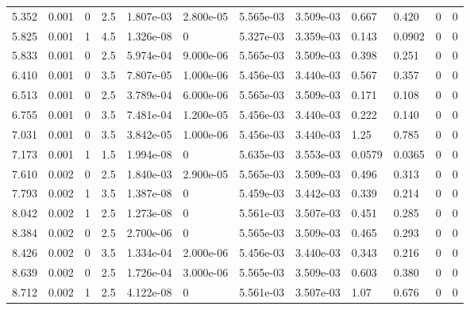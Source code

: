 \documentclass[preview]{standalone}
\begin{document}
{{\begin{tabular}{L{1.2cm}C{1.2cm} C{0.3cm}C{0.5cm} C{1.4cm}C{1.4cm} C{1.4cm}C{1.4cm} C{1.6cm}C{1.6cm} C{1.6cm}C{1.6cm}}
  5.352  &  0.001  & 0     & 2.5 &  1.807e-03  & 2.800e-05  &  5.565e-03&   3.509e-03& 0.667 & 0.420   &  0 & 0  \\ 
  5.825  &  0.001  & 1     & 4.5 &  1.326e-08  & 0  &  5.327e-03&   3.359e-03& 0.143 & 0.0902   &  0 & 0  \\ 
  5.833  &  0.001  & 0     & 2.5 &  5.974e-04  & 9.000e-06  &  5.565e-03&   3.509e-03& 0.398 & 0.251   &  0 & 0  \\ 
  6.410  &  0.001  & 0     & 3.5 &  7.807e-05  & 1.000e-06  &  5.456e-03&   3.440e-03& 0.567 & 0.357   &  0 & 0  \\ 
  6.513  &  0.001  & 0     & 2.5 &  3.789e-04  & 6.000e-06  &  5.565e-03&   3.509e-03& 0.171 & 0.108   &  0 & 0  \\ 
  6.755  &  0.001  & 0     & 3.5 &  7.481e-04  & 1.200e-05  &  5.456e-03&   3.440e-03& 0.222 & 0.140   &  0 & 0  \\ 
  7.031  &  0.001  & 0     & 3.5 &  3.842e-05  & 1.000e-06  &  5.456e-03&   3.440e-03& 1.25 & 0.785   &  0 & 0  \\ 
  7.173  &  0.001  & 1     & 1.5 &  1.994e-08  & 0  &  5.635e-03&   3.553e-03& 0.0579 & 0.0365   &  0 & 0  \\ 
  7.610  &  0.002  & 0     & 2.5 &  1.840e-03  & 2.900e-05  &  5.565e-03&   3.509e-03& 0.496 & 0.313   &  0 & 0  \\ 
  7.793  &  0.002  & 1     & 3.5 &  1.387e-08  & 0  &  5.459e-03&   3.442e-03& 0.339 & 0.214   &  0 & 0  \\ 
  8.042  &  0.002  & 1     & 2.5 &  1.273e-08  & 0  &  5.561e-03&   3.507e-03& 0.451 & 0.285   &  0 & 0  \\ 
  8.384  &  0.002  & 0     & 2.5 &  2.700e-06  & 0  &  5.565e-03&   3.509e-03& 0.465 & 0.293   &  0 & 0  \\ 
  8.426  &  0.002  & 0     & 3.5 &  1.334e-04  & 2.000e-06  &  5.456e-03&   3.440e-03& 0.343 & 0.216   &  0 & 0  \\ 
  8.639  &  0.002  & 0     & 2.5 &  1.726e-04  & 3.000e-06  &  5.565e-03&   3.509e-03& 0.603 & 0.380   &  0 & 0  \\ 
  8.712  &  0.002  & 1     & 2.5 &  4.122e-08  & 0  &  5.561e-03&   3.507e-03& 1.07 & 0.676   &  0 & 0  \\ 
\hline 
\end{tabular} 

}}
\end{document}
